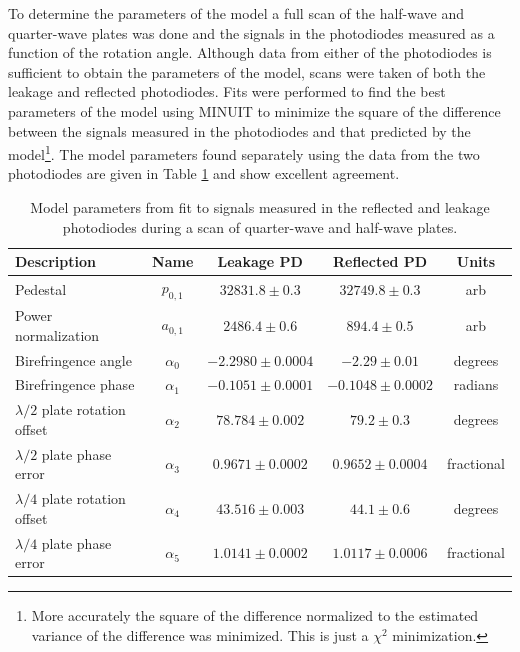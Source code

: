 To determine the parameters of the model a full scan of the half-wave and quarter-wave plates was done and the signals in the photodiodes measured as a function of the rotation angle. Although data from either of the photodiodes is sufficient to obtain the parameters of the model, scans were taken of both the leakage and reflected photodiodes. Fits were performed to find the best parameters of the model using MINUIT to minimize the square of the difference between the signals measured in the photodiodes and that predicted by the model\footnote{More accurately the square of the difference normalized to the estimated variance of the difference was minimized. This is just a $\chi^2$ minimization.}.  The model parameters found separately using the data from the two photodiodes are given in Table \ref{tab:minuit_params} and show excellent agreement. 
\begin{table}[ht]
\caption{\label{tab:minuit_params}Model parameters from fit to signals measured in the reflected and leakage photodiodes during a scan of quarter-wave and half-wave plates.}
\begin{tabular}{l|c|c|c|c}
Description&Name&Leakage PD& Reflected PD&Units\\\hline
Pedestal&$p_{0,1}$&$32831.8\pm0.3$&$32749.8\pm0.3$& arb\\
Power normalization&$a_{0,1}$&$2486.4\pm0.6$&$894.4\pm0.5$& arb\\
Birefringence angle&$\alpha_0$&$-2.2980\pm0.0004$&$-2.29\pm0.01$& degrees\\
Birefringence phase&$\alpha_1$&$-0.1051\pm0.0001$&$-0.1048\pm0.0002$& radians\\
$\lambda/2$ plate rotation offset&$\alpha_2$&$78.784\pm0.002$ &$79.2\pm0.3$& degrees\\
$\lambda/2$ plate phase error&$\alpha_3$&$0.9671\pm0.0002$&$0.9652\pm0.0004$&fractional\\
$\lambda/4$ plate rotation offset&$\alpha_4$&$43.516\pm0.003$&$44.1\pm0.6$&degrees\\
$\lambda/4$ plate phase error&$\alpha_5$&$1.0141\pm0.0002$&$1.0117\pm0.0006$&fractional\\
\end{tabular}
\end{table}

